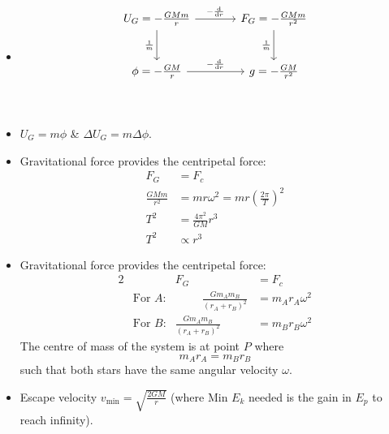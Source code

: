 \documentclass[oneside]{book}
\begin{document}
\begin{itemize}[label=\(\square\)]
    \item \[
\begin{tikzcd}[row sep=large, column sep=large]
     U_G=-\frac{GMm}{r} \arrow{r}{-\frac{\text{d}}{\text{d}r}} \arrow[swap]{d}{\frac{1}{m}} & F_G=-\frac{GMm}{r^2} \arrow[swap]{d}{\frac{1}{m}} \\
     \phi=-\frac{GM}{r} \arrow{r}{-\frac{\text{d}}{\text{d}r}} & g=-\frac{GM}{r^2}\\
\end{tikzcd}
\]
\item \(U_G=m\phi\) \& \(\Delta U_G=m\Delta\phi\).
\item Gravitational force provides the centripetal force:
\begin{align*}
    F_G&=F_c\\
    \frac{GMm}{r^2}&=mr\omega^2=mr\left(\frac{2\pi}{T}\right)^2\\
    T^2&=\frac{4\pi^2}{GM}r^3\\
    T^2 &\propto r^3
\end{align*}
\item Gravitational force provides the centripetal force:
\begin{alignat*}{2}
    && F_G&=F_c\\
    &\text{For \(A\):}& \hspace{1cm} \frac{Gm_Am_B}{(r_A+r_B)^2}&=m_Ar_A\omega^2\\
    &\text{For \(B\):}& \frac{Gm_Am_B}{(r_A+r_B)^2}&=m_Br_B\omega^2
\end{alignat*}
The centre of mass of the system is at point \(P\) where 
\[m_Ar_A=m_Br_B\]
such that both stars have the same angular velocity \(\omega\).
\item Escape velocity \(v_\text{min}=\sqrt{\frac{2GM}{r}}\) (where Min \(E_k\) needed is the gain in \(E_p\) to reach infinity).
\end{itemize}
\end{document}
